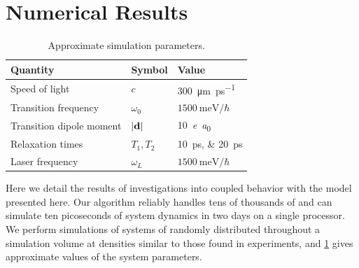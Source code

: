 \section{Numerical Results}
\begin{table}
  \begin{ruledtabular}
    \begin{tabular}{lll}
      Quantity                 & Symbol         & Value                        \\ \hline
      Speed of light           & $c$            & \SI{300}{\micro\meter \per \pico\second} \\
      Transition frequency     & $\omega_0$     & $\SI{1500}{\milli\eV}/\hbar$ \\
      Transition dipole moment & $\abs{\vb{d}}$ & \SI{10}{\elementarycharge\bohr} \\
      Relaxation times         & $T_{1}, T_{2}$ & \SIlist{10;20}{\pico\second} \\
      Laser frequency          & $\omega_L$     & $\SI{1500}{\milli\eV}/\hbar$ \\
    \end{tabular}
  \end{ruledtabular}
  \caption{\label{table:parameters}Approximate simulation parameters.}
\end{table}

Here we detail the results of investigations into coupled \qd{} behavior with the model presented here.
Our algorithm reliably handles tens of thousands of \qds{} and can simulate ten picoseconds of system dynamics in two days on a single processor.
We perform simulations of systems of \qds{} randomly distributed throughout a simulation volume at densities similar to those found in experiments, and \cref{table:parameters} gives approximate values of the system parameters.

